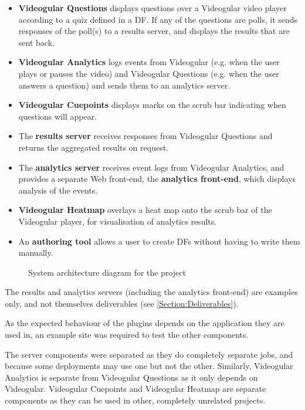 \begin{itemize}
	\item
		\textbf{Videogular Questions} displays questions over a \gls{Videogular} video player according to a quiz defined in a \gls{DF}. If any of the questions are polls, it sends responses of the poll(s) to a results server, and displays the results that are sent back.
	\item
		\textbf{Videogular Analytics} logs events from \gls{Videogular} (e.g. when the user plays or pauses the video) and Videogular Questions (e.g. when the user answers a question) and sends them to an analytics server.
	\item
		\textbf{Videogular Cuepoints} displays marks on the \gls{scrub bar} indicating when questions will appear.
	\item
		The \textbf{results server} receives responses from Videogular Questions and returns the aggregated results on request.
	\item
		The \textbf{analytics server} receives event logs from Videogular Analytics, and provides a separate Web front-end, the \textbf{analytics front-end}, which displays analysis of the events.
	\item
		\textbf{Videogular Heatmap} overlays a heat map onto the \gls{scrub bar} of the \gls{Videogular} player, for visualisation of analytics results.
	\item
		An \textbf{authoring tool} allows a user to create \glspl{DF} without having to write them manually.
\end{itemize}

\begin{figure}[h!]
	\centering
	
	\caption{System architecture diagram for the project \label{fig:System architecture diagram}}
\end{figure}

The results and analytics servers (including the analytics front-end) are examples only, and not themselves deliverables (see \autoref{Section:Deliverables}).

As the expected behaviour of the plugins depends on the application they are used in, an example site was required to test the other components.

The server components were separated as they do completely separate jobs, and because some deployments may use one but not the other. Similarly, Videogular Analytics is separate from Videogular Questions as it only depends on \gls{Videogular}. Videogular Cuepoints and Videogular Heatmap are separate components as they can be used in other, completely unrelated projects.

